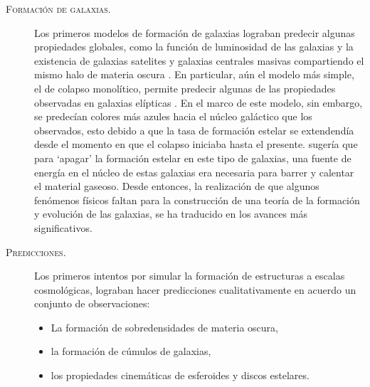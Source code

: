 \documentclass{article}
\begin{document}
\begin{description}
%
\item[\textsc{Formación de galaxias.}] Los primeros modelos de formación de galaxias lograban
predecir algunas propiedades globales, como la función de luminosidad de las galaxias y la
existencia de galaxias satelites y galaxias centrales masivas compartiendo el mismo halo de materia
oscura \citep{White1978}.
En particular, aún el modelo más simple, el de colapso monolítico, permite predecir algunas de las
propiedades observadas en galaxias elípticas \citep{Larson1974b, Larson1974c}.
En el marco de este modelo, sin embargo, se predecían colores más azules hacia el núcleo galáctico
que los observados, esto debido a que la tasa de formación estelar se extendendía desde el momento
en que el colapso iniciaba hasta el presente. \citet{Larson1974c} sugería que para `apagar' la
formación estelar en este tipo de galaxias, una fuente de energía en el núcleo de estas galaxias era
necesaria para barrer y calentar el material gaseoso. Desde entonces, la realización de que algunos
fenómenos físicos faltan para la construcción de una teoría de la formación y evolución de las
galaxias, se ha traducido en los avances más significativos.
%
\item[\textsc{Predicciones.}] Los primeros intentos por simular la formación de estructuras a
escalas cosmológicas, lograban hacer predicciones cualitativamente en acuerdo un conjunto de
observaciones:
%
\begin{itemize}
%
\item La formación de sobredensidades de materia oscura,
\item la formación de cúmulos de galaxias,
\item los propiedades cinemáticas de esferoides y discos estelares.
\end{itemize}
%
\end{description}
\end{document}
